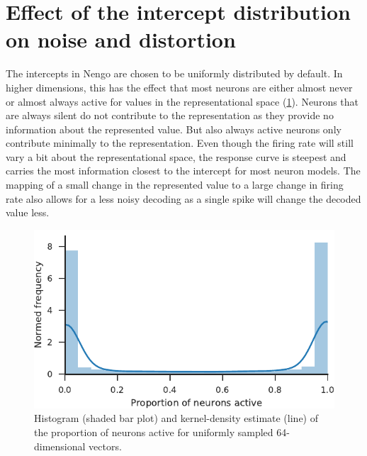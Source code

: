 \section{Effect of the intercept distribution on noise and distortion}
The intercepts in Nengo are chosen to be uniformly distributed by default.
In higher dimensions, this has the effect that most neurons are either almost never or almost always active for values in the representational space (\cref{fig:act-proportion}).
Neurons that are always silent do not contribute to the representation as they provide no information about the represented value.
But also always active neurons only contribute minimally to the representation.
Even though the firing rate will still vary a bit about the representational space, the response curve is steepest and carries the most information closest to the intercept for most neuron models.
The mapping of a small change in the represented value to a large change in firing rate also allows for a less noisy decoding as a single spike will change the decoded value less.
\begin{figure}
    \centering
    \includegraphics{figures/act-proportion}
    \caption{Histogram (shaded bar plot) and kernel-density estimate (line) of the proportion of neurons active for uniformly sampled 64-dimensional vectors.}\label{fig:act-proportion}
\end{figure}

